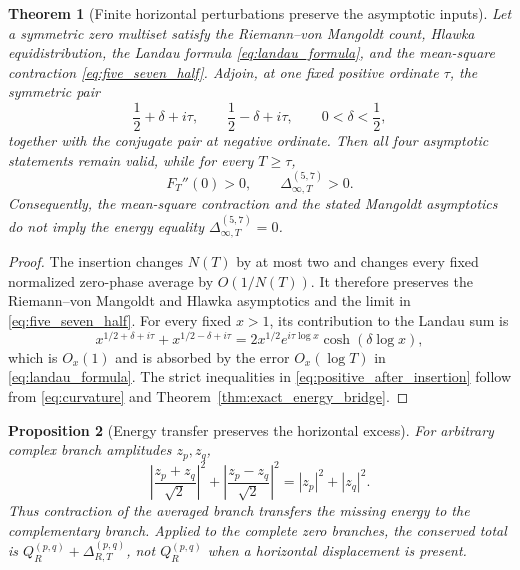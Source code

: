 \documentclass[11pt]{amsart}
\numberwithin{equation}{section}
\theoremstyle{plain}
\newtheorem{theorem}{Theorem}[section]
\newtheorem{proposition}[theorem]{Proposition}
\theoremstyle{definition}
\theoremstyle{remark}
\begin{document}
\begin{theorem}[Finite horizontal perturbations preserve the asymptotic inputs]
\label{thm:finite_perturbation}
Let a symmetric zero multiset satisfy the Riemann--von Mangoldt count, Hlawka equidistribution, the Landau formula \eqref{eq:landau_formula}, and the mean-square contraction \eqref{eq:five_seven_half}.  Adjoin, at one fixed positive ordinate $\tau$, the symmetric pair
\begin{equation}
\frac12+\delta+i\tau,
\qquad
\frac12-\delta+i\tau,
\qquad 0<\delta<\frac12,
\label{eq:inserted_pair}
\end{equation}
together with the conjugate pair at negative ordinate.  Then all four asymptotic statements remain valid, while for every $T\geq\tau$,
\begin{equation}
F_T''(0)>0,
\qquad
\Delta_{\infty,T}^{(5,7)}>0.
\label{eq:positive_after_insertion}
\end{equation}
Consequently, the mean-square contraction and the stated Mangoldt asymptotics do not imply the energy equality $\Delta_{\infty,T}^{(5,7)}=0$.
\end{theorem}

\begin{proof}
The insertion changes $N(T)$ by at most two and changes every fixed normalized zero-phase average by $O(1/N(T))$.  It therefore preserves the Riemann--von Mangoldt and Hlawka asymptotics and the limit in \eqref{eq:five_seven_half}.  For every fixed $x>1$, its contribution to the Landau sum is
\begin{equation}
x^{1/2+\delta+i\tau}+x^{1/2-\delta+i\tau}
=
2x^{1/2}e^{i\tau\log x}\cosh(\delta\log x),
\label{eq:finite_landau_perturbation}
\end{equation}
which is $O_x(1)$ and is absorbed by the error $O_x(\log T)$ in \eqref{eq:landau_formula}.  The strict inequalities in \eqref{eq:positive_after_insertion} follow from \eqref{eq:curvature} and Theorem~\ref{thm:exact_energy_bridge}.
\end{proof}

\begin{proposition}[Energy transfer preserves the horizontal excess]
\label{prop:energy_transfer}
For arbitrary complex branch amplitudes $z_p,z_q$,
\begin{equation}
\left|\frac{z_p+z_q}{\sqrt2}\right|^2
+
\left|\frac{z_p-z_q}{\sqrt2}\right|^2
=
|z_p|^2+|z_q|^2.
\label{eq:parallelogram_energy}
\end{equation}
Thus contraction of the averaged branch transfers the missing energy to the complementary branch.  Applied to the complete zero branches, the conserved total is $Q_R^{(p,q)}+\Delta_{R,T}^{(p,q)}$, not $Q_R^{(p,q)}$ when a horizontal displacement is present.
\end{proposition}
\end{document}

